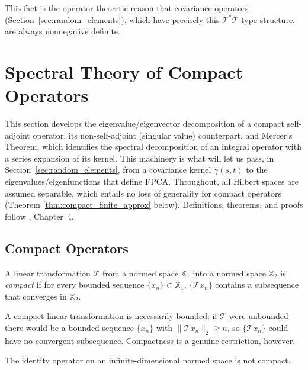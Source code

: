 This fact is the operator-theoretic reason that covariance operators
(Section~\ref{sec:random_elements}), which have precisely this
$\mathcal{T}^*\mathcal{T}$-type structure, are always nonnegative definite.

\section{Spectral Theory of Compact Operators}
\label{sec:spectral_theory}

This section develops the eigenvalue/eigenvector decomposition of a compact
self-adjoint operator, its non-self-adjoint (singular value) counterpart,
and Mercer's Theorem, which identifies the spectral decomposition of an
integral operator with a series expansion of its kernel. This machinery is
what will let us pass, in Section~\ref{sec:random_elements}, from a
covariance kernel $\gamma(s,t)$ to the eigenvalues/eigenfunctions that
define FPCA. Throughout, all Hilbert spaces are assumed separable, which
entails no loss of generality for compact operators (Theorem
\ref{thm:compact_finite_approx} below). Definitions, theorems, and proofs follow
\cite{hsingeubank2015}, Chapter~4.

\subsection{Compact Operators}

\begin{definition}
\label{def:compact}
A linear transformation $\mathcal{T}$ from a normed space $\mathbb{X}_1$
into a normed space $\mathbb{X}_2$ is \emph{compact} if for every bounded
sequence $\{x_n\}\subset\mathbb{X}_1$, $\{\mathcal{T}x_n\}$ contains a
subsequence that converges in $\mathbb{X}_2$.
\end{definition}

A compact linear transformation is necessarily bounded: if $\mathcal{T}$
were unbounded there would be a bounded sequence $\{x_n\}$ with
$\|\mathcal{T}x_n\|_2\geq n$, so $\{\mathcal{T}x_n\}$ could have no
convergent subsequence. Compactness is a genuine restriction, however.

\begin{theorem}
\label{thm:identity_not_compact}
The identity operator on an infinite-dimensional normed space is not
compact.
\end{theorem}

